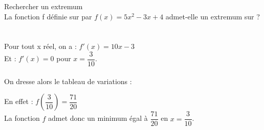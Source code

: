 \begin{bmethodet}{Rechercher un extremum}
\\
	La fonction f définie sur \R par $f(x)=5x^2-3x+4$ admet-elle un extremum sur \R ?\\
	\ \\
\\
Pour tout x réel, on a : $f'(x)=10x-3$ \\
Et : $f'(x)=0$ pour $x=\dfrac{3}{10}$.\\
\\
On dresse alors le tableau de variations :\\
\begin{center}
\end{center}
En effet : $f\left(\dfrac{3}{10}\right)=\dfrac{71}{20}$\\
La fonction $f$ admet donc un minimum égal à $\dfrac{71}{20}$ en $x= \dfrac{3}{10}$.\\
\end{bmethodet}


